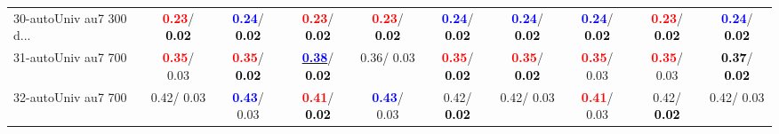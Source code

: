 \begin{table}[h]
\begin{center}
{\begin{tabular}{lc|c|c|c|c|c|c|c|c}
30-autoUniv au7 300 d... & \textcolor{red}{\textbf{  0.23}}/\textcolor{black}{\textbf{  0.02}} & \textcolor{blue}{\textbf{  0.24}}/\textcolor{black}{\textbf{  0.02}} & \textcolor{red}{\textbf{  0.23}}/\textcolor{black}{\textbf{  0.02}} & \textcolor{red}{\textbf{  0.23}}/\textcolor{black}{\textbf{  0.02}} & \textcolor{blue}{\textbf{  0.24}}/\textcolor{black}{\textbf{  0.02}} & \textcolor{blue}{\textbf{  0.24}}/\textcolor{black}{\textbf{  0.02}} & \textcolor{blue}{\textbf{  0.24}}/\textcolor{black}{\textbf{  0.02}} & \textcolor{red}{\textbf{  0.23}}/\textcolor{black}{\textbf{  0.02}} & \textcolor{blue}{\textbf{  0.24}}/\textcolor{black}{\textbf{  0.02}} \\
31-autoUniv au7 700 & \textcolor{red}{\textbf{  0.35}}/  0.03 & \textcolor{red}{\textbf{  0.35}}/\textcolor{black}{\textbf{  0.02}} & \underline{\textcolor{blue}{\textbf{  0.38}}}/\textcolor{black}{\textbf{  0.02}} &   0.36/  0.03 & \textcolor{red}{\textbf{  0.35}}/\textcolor{black}{\textbf{  0.02}} & \textcolor{red}{\textbf{  0.35}}/\textcolor{black}{\textbf{  0.02}} & \textcolor{red}{\textbf{  0.35}}/  0.03 & \textcolor{red}{\textbf{  0.35}}/  0.03 & \textcolor{black}{\textbf{  0.37}}/\textcolor{black}{\textbf{  0.02}} \\
32-autoUniv au7 700 &   0.42/  0.03 & \textcolor{blue}{\textbf{  0.43}}/  0.03 & \textcolor{red}{\textbf{  0.41}}/\textcolor{black}{\textbf{  0.02}} & \textcolor{blue}{\textbf{  0.43}}/  0.03 &   0.42/\textcolor{black}{\textbf{  0.02}} &   0.42/  0.03 & \textcolor{red}{\textbf{  0.41}}/  0.03 &   0.42/\textcolor{black}{\textbf{  0.02}} &   0.42/  0.03 \\\end{tabular}}\label{stratsALCKappa0Allallb}
\end{center}
\end{table}
